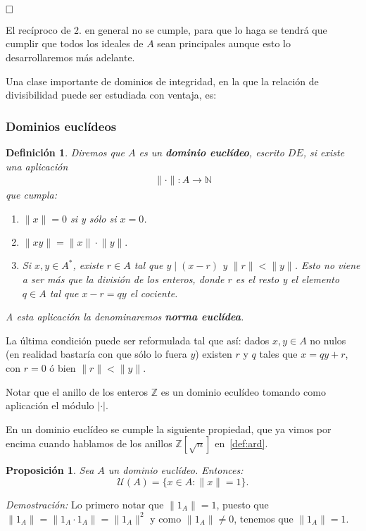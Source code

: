 \documentclass[12pt]{article}
\newtheorem{proposition}[theorem]{Proposición}
\newtheorem{definition}[theorem]{Definición}
\providecommand{\norm}[1]{\lVert#1\rVert}
\begin{document}
$\hfill \square$

El recíproco de $2.$ en general no se cumple, para que lo haga se tendrá que cumplir que todos los ideales de $A$ sean principales aunque esto lo desarrollaremos más adelante.

Una clase importante de dominios de integridad, en la que la relación de divisibilidad puede ser estudiada con ventaja, es:

\subsubsection{Dominios euclídeos}
\begin{definition} \label{eq:de} Diremos que $A$ es un \textbf{dominio euclídeo}, escrito $DE$, si existe una aplicación $$\begin{array}{rccl}
\norm{\cdot}\colon A\longrightarrow \mathbb{N}
\end{array}
$$
que cumpla: \begin{enumerate}
\item $\norm{x} = 0$ si y sólo si $x = 0$.
\item $\norm{xy} = \norm{x} \cdot \norm{y}.$
\item Si $x, y \in A^{\ast}$, existe $r \in A$ tal que $y \mid (x-r)$ y $\norm{r} < \norm{y}$. Esto no viene a ser más que la división de los enteros, donde $r$ es el resto y el elemento $q \in A$ tal que $x-r = qy$ el cociente. 
\end{enumerate}
A esta aplicación la denominaremos \textbf{norma euclídea}.
\end{definition}

La última condición puede ser reformulada tal que así: dados $x,y \in A$ no nulos (en realidad bastaría con que sólo lo fuera $y$) existen $r$ y $q$ tales que $x=qy+r$, con $r=0$ ó bien $\norm{r} < \norm{y}$.

Notar que el anillo de los enteros $\mathbb{Z}$ es un dominio eculídeo tomando como aplicación el módulo $|\cdot |$.

En un dominio euclídeo se cumple la siguiente propiedad, que ya vimos por encima cuando hablamos de los anillos $\mathbb{Z}[\sqrt{n}]$ en~\ref{def:ard}.

\begin{proposition} Sea $A$ un dominio euclídeo. Entonces: $$\mathcal{U}(A) = \lbrace x \in A : \norm{x} = 1 \rbrace.$$
\end{proposition}
\emph{Demostración: } Lo primero notar que $\norm{1_{A}} = 1$, puesto que $\norm{1_{A}} = \norm{1_{A}\cdot 1_{A}} = \norm{1_{A}}^{2}$ y como $\norm{1_{A}} \neq 0$, tenemos que $\norm{1_{A}} = 1$.
\end{document}

